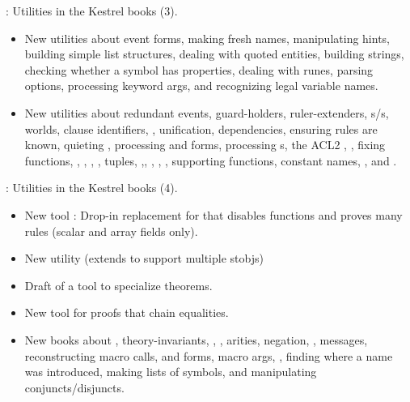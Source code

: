 
\begin{frame}

\implibtitle

:
Utilities in the Kestrel books (3).
\begin{itemize}
\item New utilities about event forms, making fresh names,
  manipulating hints, building simple list structures, dealing with
  quoted entities, building strings, checking whether a symbol has
  properties, dealing with runes, parsing options, processing keyword
  args, and recognizing legal variable names.
\item New utilities about redundant events, guard-holders, ruler-extenders,
  s/s, worlds, clause identifiers,
  , unification, dependencies, ensuring rules are known,
  quieting , processing  and  forms,
  processing s, the ACL2 , ,
  fixing functions, , , ,
  , tuples, ,,
  , ,
  , supporting functions,
  constant names, , and .
\end{itemize}

\end{frame}


\begin{frame}

\implibtitle

:
Utilities in the Kestrel books (4).
\begin{itemize}
\item New tool : Drop-in replacement for
   that disables functions and proves many rules
  (scalar and array fields only).
\item New utility  (extends 
  to support multiple stobjs)
\item Draft of a tool to specialize theorems.
\item New  tool for proofs that chain equalities.
\item New books about , theory-invariants,
  , , arities,
  negation, , messages, reconstructing macro calls,
   and  forms, macro args,
  , finding where a name was introduced, making
  lists of symbols, and manipulating conjuncts/disjuncts.
\end{itemize}

\end{frame}

